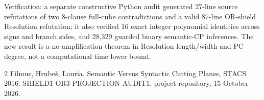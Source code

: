 \documentclass{article}
\begin{document}
\noindent Verification: a separate constructive Python audit generated 27-line source refutations of two 8-clause full-cube contradictions and a valid 87-line OR-shield Resolution refutation; it also verified 16 exact integer polynomial identities across signs and branch sides, and 28,329 guarded binary semantic-CP inferences. The new result is a no-amplification theorem in Resolution length/width and PC degree, not a computational time lower bound.

\begin{thebibliography}{2}
 Filmus, Hrube\v{s}, Lauria. Semantic Versus Syntactic Cutting Planes, STACS 2016.
 SHIELD1 OR3-PROJECTION-AUDIT1, project repository, 15 October 2026.
\end{thebibliography}
\end{document}
